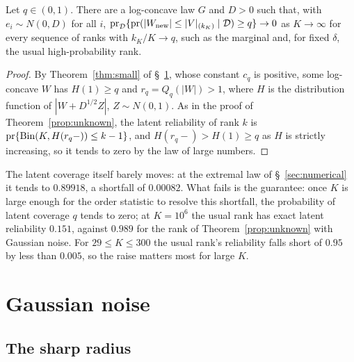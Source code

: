 \documentclass[lineno]{biometrika}
\newcommand{\pr}{\mathrm{pr}}
\begin{document}
\begin{proposition}\label{prop:fail}
Let $q \in (0,1)$. There are a log-concave law $G$ and $D > 0$ such that, with $e_i \sim N(0, D)$ for all $i$, $\pr_{\mathcal D}\{\pr(|W_{\rm new}| \le |V|_{(k_K)} \mid \mathcal D) \ge q\} \to 0$ as $K \to \infty$ for every sequence of ranks with $k_K/K \to q$, such as the marginal and, for fixed $\delta$, the usual high-probability rank.
\end{proposition}

\begin{proof}
By Theorem~\ref{thm:small} of \S~\ref{sec:mean}, whose constant $c_q$ is positive, some log-concave $W$ has $H(1) \ge q$ and $r_q = Q_q(|W|) > 1$, where $H$ is the distribution function of $|W + D^{1/2}Z|$, $Z \sim N(0, 1)$. As in the proof of Theorem~\ref{prop:unknown}, the latent reliability of rank $k$ is $\pr\{{\rm Bin}(K, H(r_q-)) \le k - 1\}$, and $H(r_q-) > H(1) \ge q$ as $H$ is strictly increasing, so it tends to zero by the law of large numbers.
\end{proof}

The latent coverage itself barely moves: at the extremal law of \S~\ref{sec:numerical} it tends to $0.89918$, a shortfall of $0.00082$. What fails is the guarantee: once $K$ is large enough for the order statistic to resolve this shortfall, the probability of latent coverage $q$ tends to zero; at $K = 10^6$ the usual rank has exact latent reliability $0.151$, against $0.989$ for the rank of Theorem~\ref{prop:unknown} with Gaussian noise. For $29 \le K \le 300$ the usual rank's reliability falls short of $0.95$ by less than $0.005$, so the raise matters most for large $K$.

\section{Gaussian noise}\label{sec:mean}

\subsection{The sharp radius}\label{sec:setup}
\end{document}
